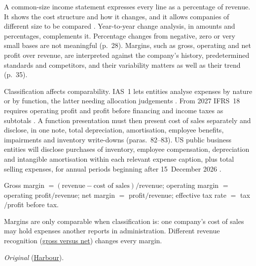 \begin{qfmethod}\label{meth:income-statement-ratios}
 A common-size income statement expresses every line as a percentage of revenue. It shows the cost structure and how it changes, and it allows companies of different size to be compared \citep[pp.~28--33]{financial-statement-analysis-2009}. Year-to-year change analysis, in amounts and percentages, complements it. Percentage changes from negative, zero or very small bases are not meaningful (p.~28). Margins, such as gross, operating and net profit over revenue, are interpreted against the company's history, predetermined standards and competitors, and their variability matters as well as their trend (p.~35).

Classification affects comparability. IAS~1 lets entities analyse expenses by nature or by function, the latter needing allocation judgements \citep[IAS~1 paras.~99 and~103]{eu-2023-1803-ias1}. From 2027 IFRS~18 requires operating profit and profit before financing and income taxes as subtotals \citep[Annex, IFRS~18 para.~69]{eu-2026-338-ifrs18}. A function presentation must then present cost of sales separately and disclose, in one note, total depreciation, amortisation, employee benefits, impairments and inventory write-downs (paras.~82--83). US public business entities will disclose purchases of inventory, employee compensation, depreciation and intangible amortisation within each relevant expense caption, plus total selling expenses, for annual periods beginning after 15~December 2026 \citep[pp.~1--3]{us-expense-disaggregation-2024}.

 Gross margin $=(\text{revenue}-\text{cost of sales})/\text{revenue}$; operating margin $=$ operating profit$/$revenue; net margin $=$ profit$/$revenue; effective tax rate $=$ tax$/$profit before tax.

 Margins are only comparable when classification is: one company's cost of sales may hold expenses another reports in administration. Different revenue recognition (\hyperref[meth:revenue-recognition-analysis]{gross versus net}) changes every margin.

 \emph{Original} (\hyperref[ex:harbour-tools-statements]{Harbour}).


\end{qfmethod}

